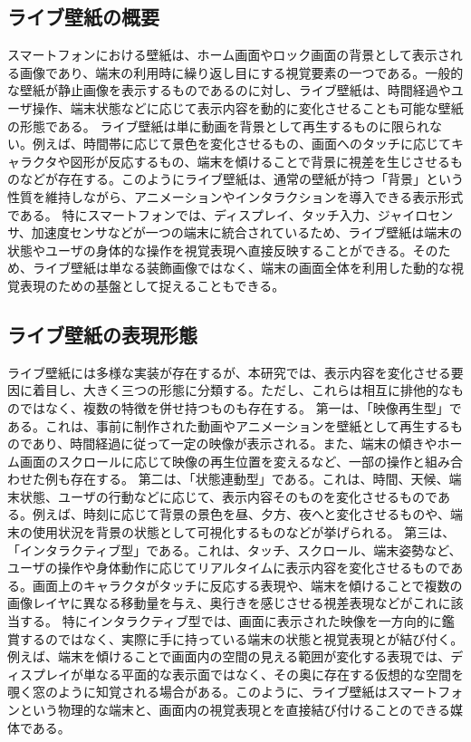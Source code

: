 \subsection{ライブ壁紙の概要}
スマートフォンにおける壁紙は、ホーム画面やロック画面の背景として表示される画像であり、端末の利用時に繰り返し目にする視覚要素の一つである。一般的な壁紙が静止画像を表示するものであるのに対し、ライブ壁紙は、時間経過やユーザ操作、端末状態などに応じて表示内容を動的に変化させることも可能な壁紙の形態である。
ライブ壁紙は単に動画を背景として再生するものに限られない。例えば、時間帯に応じて景色を変化させるもの、画面へのタッチに応じてキャラクタや図形が反応するもの、端末を傾けることで背景に視差を生じさせるものなどが存在する。このようにライブ壁紙は、通常の壁紙が持つ「背景」という性質を維持しながら、アニメーションやインタラクションを導入できる表示形式である。
特にスマートフォンでは、ディスプレイ、タッチ入力、ジャイロセンサ、加速度センサなどが一つの端末に統合されているため、ライブ壁紙は端末の状態やユーザの身体的な操作を視覚表現へ直接反映することができる。そのため、ライブ壁紙は単なる装飾画像ではなく、端末の画面全体を利用した動的な視覚表現のための基盤として捉えることもできる。


\subsection{ライブ壁紙の表現形態}
ライブ壁紙には多様な実装が存在するが、本研究では、表示内容を変化させる要因に着目し、大きく三つの形態に分類する。ただし、これらは相互に排他的なものではなく、複数の特徴を併せ持つものも存在する。
第一は、「映像再生型」である。これは、事前に制作された動画やアニメーションを壁紙として再生するものであり、時間経過に従って一定の映像が表示される。また、端末の傾きやホーム画面のスクロールに応じて映像の再生位置を変えるなど、一部の操作と組み合わせた例も存在する。
第二は、「状態連動型」である。これは、時間、天候、端末状態、ユーザの行動などに応じて、表示内容そのものを変化させるものである。例えば、時刻に応じて背景の景色を昼、夕方、夜へと変化させるものや、端末の使用状況を背景の状態として可視化するものなどが挙げられる。
第三は、「インタラクティブ型」である。これは、タッチ、スクロール、端末姿勢など、ユーザの操作や身体動作に応じてリアルタイムに表示内容を変化させるものである。画面上のキャラクタがタッチに反応する表現や、端末を傾けることで複数の画像レイヤに異なる移動量を与え、奥行きを感じさせる視差表現などがこれに該当する。
特にインタラクティブ型では、画面に表示された映像を一方向的に鑑賞するのではなく、実際に手に持っている端末の状態と視覚表現とが結び付く。例えば、端末を傾けることで画面内の空間の見える範囲が変化する表現では、ディスプレイが単なる平面的な表示面ではなく、その奥に存在する仮想的な空間を覗く窓のように知覚される場合がある。このように、ライブ壁紙はスマートフォンという物理的な端末と、画面内の視覚表現とを直接結び付けることのできる媒体である。

